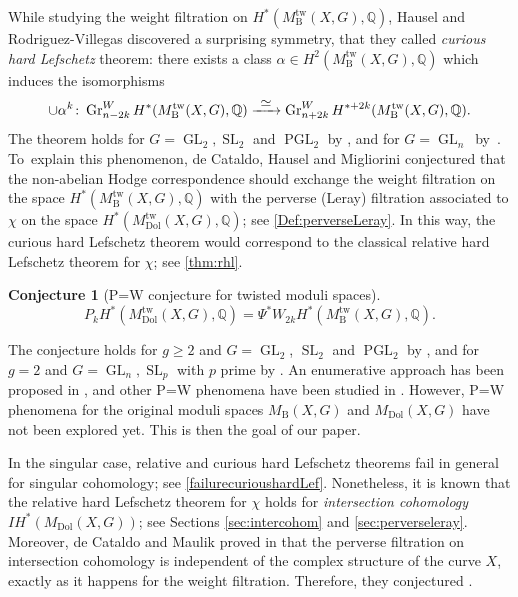 \documentclass[JEP,XML,SOM,Unicode, NoEqCountersInSection,NoFloatCountersInSection,published]{cedram}
\newcommand{\To}[1]{\mathchoice{\xrightarrow{\textstyle\kern4pt#1\kern3pt}}{\stackrel{#1}{\longrightarrow}}{}{}}
\newcommand{\IH}{\mathit{IH}}
\newtheorem{conj}[thm]{Conjecture}
\theoremstyle{definition}
\newcommand{\QQ}{\mathbb{Q}}
\newcommand{\Gr}{\operatorname{Gr}}
\newcommand{\Gl}{\operatorname{GL}}
\newcommand{\Sl}{\operatorname{SL}}
\newcommand{\PGl}{\operatorname{PGL}}
\newcommand{\mdoltwisted}{M_{\mathrm{Dol}}^{\mathrm{tw}}(X,G)}
\newcommand{\mbtwisted}{M_{\mathrm{B}}^{\mathrm{tw}}(X,G)}
\newcommand{\MDolG}{{M}_{\mathrm{Dol}}(X,G)}
\newcommand{\MBG}{{M}_{\mathrm{B}}(X,G)}
\begin{document}
While studying the weight filtration on $H^*(\mbtwisted, \QQ)$, Hausel and Rodriguez-Villegas discovered a surprising symmetry, that they called \emph{curious hard Lefschetz} theorem: there exists a class $\alpha\in H^2(\mbtwisted, \QQ)$ which induces the isomorphisms%
\begin{equation}\label{cHL}
\cup {\alpha^k}\colon \Gr^W_{n-2k}H^*(\mbtwisted, \QQ)\To{\simeq} \Gr^W_{n+2k}H^{*+2k}(\mbtwisted, \QQ).
\end{equation}
The theorem holds for $G\!=\!\Gl_2, \Sl_2$ and $\PGl_2$ by \cite{HauselRodriguez-Villegas2008}, and for $G\!=\!\Gl_n$~by~\cite{Mellit2019}.
To~explain this phenomenon, de Cataldo, Hausel and Migliorini conjectured that the non-abelian Hodge correspondence should exchange the weight filtration on the space $H^*(\mbtwisted, \QQ)$ with the perverse (Leray) filtration associated to $\chi$ on the space $H^*(\mdoltwisted, \QQ)$; see \cref{Def:perverseLeray}. In this way, the curious hard Lefschetz theorem would correspond to the classical relative hard Lefschetz theorem for $\chi$; see \cref{thm:rhl}.

\skpt
\begin{conj}[P=W conjecture for twisted moduli spaces]
\mbox{}\vspace*{-.7\baselineskip}
\[
P_k H^*(\mdoltwisted, \QQ) = \Psi^* W_{2k}H^*(\mbtwisted, \QQ).
\]
\end{conj}

The conjecture holds for $g\geq 2$ and $G=\Gl_2$, $\Sl_2$ and $\PGl_2$ by \cite{deCataldoHauselMigliorini2012}, and for $g=2$ and $G=\Gl_n, \Sl_p$ with $p$ prime by \cite{deCataldoMaulikShen2019, deCataldoMaulikShen2020}. An enumerative approach has been proposed in \cite{CHS2020}, and other P=W phenomena have been studied in
\cite{ShenZhang2018, ShenYin2018, FelisettiShenYin2021, ZhangZili2019, Szabo2018, Szabo2019, NemethiSzabo2020, HKP2019, Harder2019, HLSY2019, Mauri2021}.
However, P=W phenomena for the original moduli spaces $\MBG$ and $\MDolG$ have not been explored yet. This is then the goal of our paper.

In the singular case, relative and curious hard Lefschetz theorems fail in general for singular cohomology; see \cref{failurecurioushardLef}. Nonetheless, it is known that the relative hard Lefschetz theorem for $\chi$ holds for \emph{intersection cohomology} $\IH^*(\MDolG)$; see Sections \ref{sec:intercohom} and \ref{sec:perverseleray}.
Moreover, de Cataldo and Maulik proved in \cite{deCataldoMaulik2018} that the perverse filtration on intersection cohomology is independent of the complex structure of the curve $X$, exactly as it happens for the weight filtration. Therefore, they conjectured \cite[Quest.\,4.1.7]{deCataldoMaulik2018}.
\end{document}
